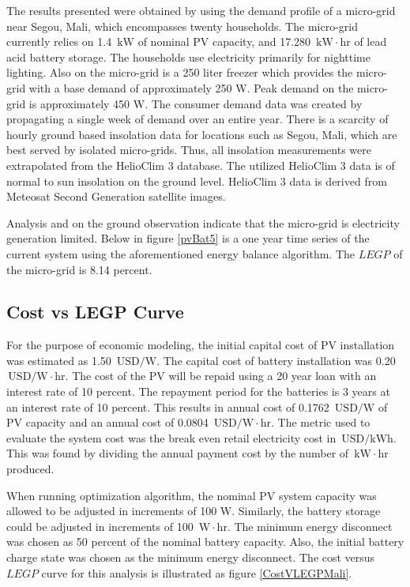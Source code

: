 \documentclass{article}
\newcommand{\unit}[1]{\ensuremath{\, \mathrm{#1}}}
\begin{document}
The results presented were obtained by using the demand profile of a micro-grid near Segou, Mali, which encompasses twenty households.
The micro-grid currently relies on 1.4 \unit{kW} of nominal PV capacity, and 17.280 \unit{kW\cdot hr} of lead acid battery storage.
The households use electricity primarily for nighttime lighting.
Also on the micro-grid is a 250 liter freezer which provides the micro-grid with a base demand of approximately 250 W. 
Peak demand on the micro-grid is approximately 450 W. 
The consumer demand data was created by propagating a single week of demand over an entire year.
There is a scarcity of hourly ground based insolation data for locations such as Segou, Mali, which are best served by isolated micro-grids. 
Thus, all insolation measurements were extrapolated from the HelioClim 3 database. The utilized HelioClim 3 data is of normal to sun insolation on the ground level.
HelioClim 3 data is derived from Meteosat Second Generation satellite images. 

Analysis and on the ground observation indicate that the micro-grid is electricity generation limited. 
Below in figure \ref{pvBat5} is a one year time series of the current system using the aforementioned energy balance algorithm.
The $LEGP$ of the micro-grid is 8.14 percent.

\subsection{Cost vs LEGP Curve}

For the purpose of economic modeling, the initial capital cost of PV installation was estimated as 1.50 \unit{USD/W}.
The capital cost of battery installation was 0.20 \unit{USD/W\cdot hr}. 
The cost of the PV will be repaid using a 20 year loan with an interest rate of 10 percent. 
The repayment period for the batteries is 3 years at an interest rate of 10 percent. 
This results in annual cost of 0.1762 \unit{USD/W} of PV capacity and an annual cost of 0.0804 \unit{USD/W\cdot hr}.
The metric used to evaluate the system cost was the break even retail electricity cost in \unit{USD/kWh}. This was found by dividing the annual payment cost by the number of \unit{kW\cdot hr} produced.

When running optimization algorithm, the nominal PV system capacity was allowed to be adjusted in increments of 100 W. 
Similarly, the battery storage could be adjusted in increments of 100 \unit{W\cdot hr}.
The minimum energy disconnect was chosen as 50 percent of the nominal battery capacity.
Also, the initial battery charge state was chosen as the minimum energy disconnect.
The cost versus $LEGP$ curve for this analysis is illustrated as figure \ref{CostVLEGPMali}.
\end{document}
